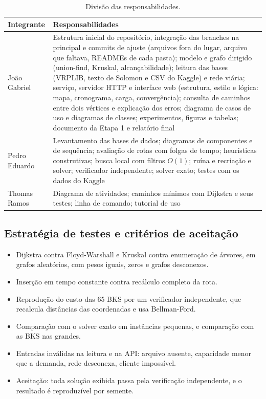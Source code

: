 \documentclass[12pt]{article}
\begin{document}
\begin{table}[!ht]
\centering
\small
\begin{tabular}{L{2.2cm}L{8.4cm}}
\toprule
Integrante & Responsabilidades \\
\midrule
João Gabriel & Estrutura inicial do repositório, integração das branches na principal e commits de ajuste (arquivos fora do lugar, arquivo que faltava, READMEs de cada pasta); modelo e grafo dirigido (union-find, Kruskal, alcançabilidade); leitura das bases (VRPLIB, texto de Solomon e CSV do Kaggle) e rede viária; serviço, servidor HTTP e interface web (estrutura, estilo e lógica: mapa, cronograma, carga, convergência); consulta de caminhos entre dois vértices e explicação dos erros; diagrama de casos de uso e diagramas de classes; experimentos, figuras e tabelas; documento da Etapa 1 e relatório final \\
Pedro Eduardo & Levantamento das bases de dados; diagramas de componentes e de sequência; avaliação de rotas com folgas de tempo; heurísticas construtivas; busca local com filtros $O(1)$; ruína e recriação e solver; verificador independente; solver exato; testes com os dados do Kaggle \\
Thomas Ramos & Diagrama de atividades; caminhos mínimos com Dijkstra e seus testes; linha de comando; tutorial de uso \\
\bottomrule
\end{tabular}
\caption{Divisão das responsabilidades.}
\end{table}

\subsection{Estratégia de testes e critérios de aceitação}

\begin{itemize}
  \item Dijkstra contra Floyd-Warshall e Kruskal contra enumeração de árvores, em grafos aleatórios, com pesos iguais, zeros e grafos desconexos.
  \item Inserção em tempo constante contra recálculo completo da rota.
  \item Reprodução do custo das 65 BKS por um verificador independente, que recalcula distâncias das coordenadas e usa Bellman-Ford.
  \item Comparação com o solver exato em instâncias pequenas, e comparação com as BKS nas grandes.
  \item Entradas inválidas na leitura e na API: arquivo ausente, capacidade menor que a demanda, rede desconexa, cliente impossível.
  \item Aceitação: toda solução exibida passa pela verificação independente, e o resultado é reproduzível por semente.
\end{itemize}
\end{document}
